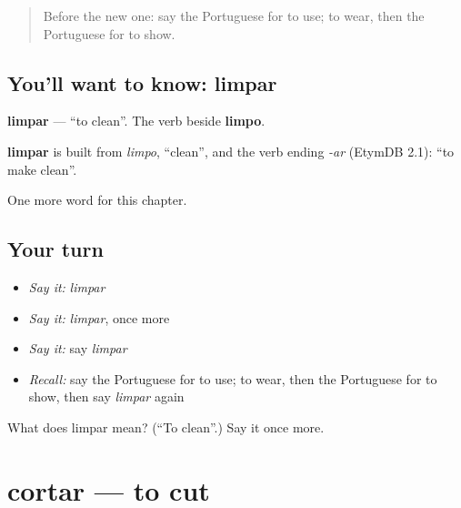 \label{lesson:PT-C80-limpar}



\begin{quote}
Before the new one: say the Portuguese for to use; to wear, then the Portuguese for to show.
\end{quote}

\subsection*{You'll want to know: limpar}
\textbf{limpar} — \textquotedblleft{}to clean\textquotedblright{}. The verb beside \textbf{limpo}.

\begin{cousinweb}
\textbf{limpar} is built from \emph{limpo}, \textquotedblleft{}clean\textquotedblright{}, and the verb ending \emph{-ar} (EtymDB 2.1): \textquotedblleft{}to make clean\textquotedblright{}.
\end{cousinweb}

\begin{grammarlens}[title={What you've built}]
One more word for this chapter.
\end{grammarlens}

\subsection*{Your turn}
\begin{itemize}
\raggedright
  \item \emph{Say it:} \emph{limpar}
  \item \emph{Say it:} \emph{limpar}, once more
  \item \emph{Say it:} say \emph{limpar}
  \item \emph{Recall:} say the Portuguese for to use; to wear, then the Portuguese for to show, then say \emph{limpar} again
\end{itemize}

\begin{tcolorbox}[breakable,colback=teal!4,colframe=teal!35!black,title={Before you move on}]
What does limpar mean? (\textquotedblleft{}To clean\textquotedblright{}.) Say it once more.
\end{tcolorbox}
\section[cortar]{cortar — to cut}

\label{lesson:PT-C80-cortar}



